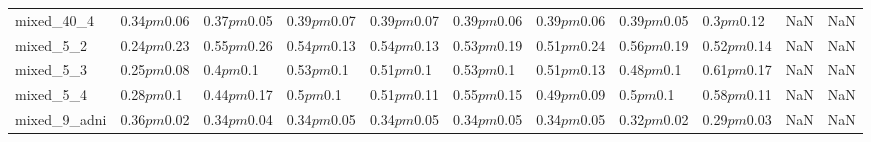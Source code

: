 \begin{tabular}{lllllllllll}
mixed_40_4 & 0.34$pm$0.06 & 0.37$pm$0.05 & 0.39$pm$0.07 & 0.39$pm$0.07 & 0.39$pm$0.06 & 0.39$pm$0.06 & 0.39$pm$0.05 & 0.3$pm$0.12 & NaN & NaN \\
mixed_5_2 & 0.24$pm$0.23 & 0.55$pm$0.26 & 0.54$pm$0.13 & 0.54$pm$0.13 & 0.53$pm$0.19 & 0.51$pm$0.24 & 0.56$pm$0.19 & 0.52$pm$0.14 & NaN & NaN \\
mixed_5_3 & 0.25$pm$0.08 & 0.4$pm$0.1 & 0.53$pm$0.1 & 0.51$pm$0.1 & 0.53$pm$0.1 & 0.51$pm$0.13 & 0.48$pm$0.1 & 0.61$pm$0.17 & NaN & NaN \\
mixed_5_4 & 0.28$pm$0.1 & 0.44$pm$0.17 & 0.5$pm$0.1 & 0.51$pm$0.11 & 0.55$pm$0.15 & 0.49$pm$0.09 & 0.5$pm$0.1 & 0.58$pm$0.11 & NaN & NaN \\
mixed_9_adni & 0.36$pm$0.02 & 0.34$pm$0.04 & 0.34$pm$0.05 & 0.34$pm$0.05 & 0.34$pm$0.05 & 0.34$pm$0.05 & 0.32$pm$0.02 & 0.29$pm$0.03 & NaN & NaN \\
\bottomrule
\end{tabular}
